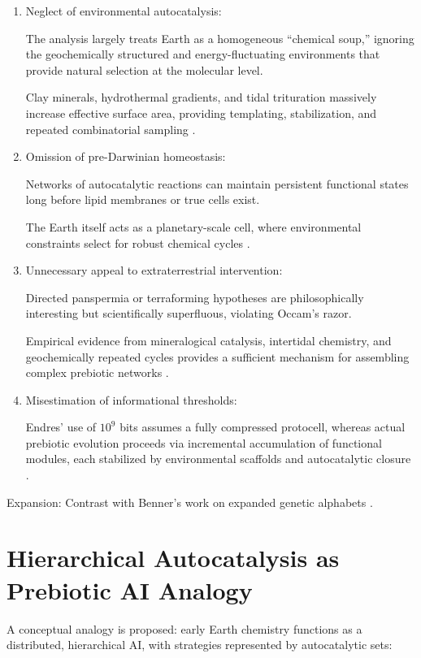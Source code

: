 \documentclass[openany]{book}
\begin{document}
\begin{enumerate}
\item Neglect of environmental autocatalysis:

The analysis largely treats Earth as a homogeneous “chemical soup,” ignoring the geochemically structured and energy-fluctuating environments that provide natural selection at the molecular level.

Clay minerals, hydrothermal gradients, and tidal trituration massively increase effective surface area, providing templating, stabilization, and repeated combinatorial sampling \citep{hazen2005, barge2022}.

\item Omission of pre-Darwinian homeostasis:

Networks of autocatalytic reactions can maintain persistent functional states long before lipid membranes or true cells exist.

The Earth itself acts as a planetary-scale cell, where environmental constraints select for robust chemical cycles \citep{peng2022}.

\item Unnecessary appeal to extraterrestrial intervention:

Directed panspermia or terraforming hypotheses are philosophically interesting but scientifically superfluous, violating Occam’s razor.

Empirical evidence from mineralogical catalysis, intertidal chemistry, and geochemically repeated cycles provides a sufficient mechanism for assembling complex prebiotic networks \citep{gan2024}.

\item Misestimation of informational thresholds:

Endres’ use of $10^9$ bits assumes a fully compressed protocell, whereas actual prebiotic evolution proceeds via incremental accumulation of functional modules, each stabilized by environmental scaffolds and autocatalytic closure \citep{plum2025}.
\end{enumerate}

Expansion: Contrast with Benner's work on expanded genetic alphabets \citep{benner2010}.

\section{Hierarchical Autocatalysis as Prebiotic AI Analogy}
A conceptual analogy is proposed: early Earth chemistry functions as a distributed, hierarchical AI, with strategies represented by autocatalytic sets:
\end{document}
